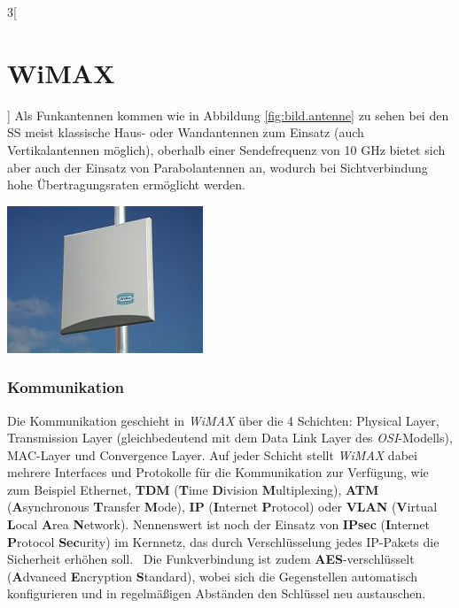 \begin{multicols}{3}[\section{WiMAX}]
Als Funkantennen kommen wie in Abbildung \ref{fig:bild.antenne} zu sehen bei den SS meist klassische Haus- oder Wandantennen zum Einsatz (auch Vertikalantennen möglich), oberhalb einer Sendefrequenz von 10 GHz bietet sich aber auch der Einsatz von Parabolantennen an, wodurch bei Sichtverbindung hohe Übertragungsraten ermöglicht werden.~\cite{wmx.2}

\begin{Figure}
	\includegraphics[width=\linewidth]{Kapitel/WiMAX/Grafiken/Antenne.jpg}
	\label{fig:bild.antenne}
\end{Figure}

\subsubsection*{Kommunikation}
Die Kommunikation geschieht in \textit{WiMAX} über die 4 Schichten: Physical Layer, Transmission Layer (gleichbedeutend mit dem Data Link Layer des \textit{OSI}-Modells), MAC-Layer und Convergence Layer. Auf jeder Schicht stellt \textit{WiMAX} dabei mehrere Interfaces und Protokolle für die Kommunikation zur Verfügung, wie zum Beispiel Ethernet, \textbf{TDM} (\textbf{T}ime \textbf{D}ivision \textbf{M}ultiplexing), \textbf{ATM} (\textbf{A}synchronous \textbf{T}ransfer \textbf{M}ode), \textbf{IP} (\textbf{I}nternet \textbf{P}rotocol) oder \textbf{VLAN} (\textbf{V}irtual \textbf{L}ocal \textbf{A}rea \textbf{N}etwork). Nennenswert ist noch der Einsatz von \textbf{IPsec} (\textbf{I}nternet \textbf{P}rotocol \textbf{Sec}urity) im Kernnetz, das durch Verschlüsselung jedes IP-Pakets  die Sicherheit erhöhen soll.~\cite{wmx.11}
Die Funkverbindung ist zudem \textbf{AES}-verschlüsselt (\textbf{A}dvanced \textbf{E}ncryption \textbf{S}tandard), wobei sich die Gegenstellen automatisch konfigurieren und in regelmäßigen Abständen den Schlüssel neu austauschen.~\cite{wmx.8}


\end{multicols}
